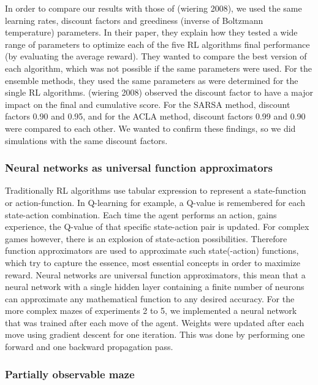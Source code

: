 In order to compare our results with those of (wiering 2008), we used
the same learning rates, discount factors and greediness (inverse of
Boltzmann temperature) parameters. In their paper, they explain how they
tested a wide range of parameters to optimize each of the five RL
algorithms final performance (by evaluating the average reward). They
wanted to compare the best version of each algorithm, which was not
possible if the same parameters were used. For the ensemble methods,
they used the same parameters as were determined for the single RL
algorithms. (wiering 2008) observed the discount factor to have a major
impact on the final and cumulative score. For the SARSA method, discount
factors 0.90 and 0.95, and for the ACLA method, discount factors 0.99
and 0.90 were compared to each other. We wanted to confirm these
findings, so we did simulations with the same discount factors.

\hypertarget{neural-networks-as-universal-function-approximators}{%
\subsubsection{Neural networks as universal function
approximators}\label{neural-networks-as-universal-function-approximators}}

Traditionally RL algorithms use tabular expression to represent a
state-function or action-function. In Q-learning for example, a Q-value
is remembered for each state-action combination. Each time the agent
performs an action, gains experience, the Q-value of that specific
state-action pair is updated. For complex games however, there is an
explosion of state-action possibilities. Therefore function
approximators are used to approximate such state(-action) functions,
which try to capture the essence, most essential concepts in order to
maximize reward. Neural networks are universal function approximators,
this mean that a neural network with a single hidden layer containing a
finite number of neurons can approximate any mathematical function to
any desired accuracy. For the more complex mazes of experiments 2 to 5,
we implemented a neural network that was trained after each move of the
agent. Weights were updated after each move using gradient descent for
one iteration. This was done by performing one forward and one backward
propagation pass.

\hypertarget{partially-observable-maze}{%
\subsubsection{Partially observable
maze}\label{partially-observable-maze}}


